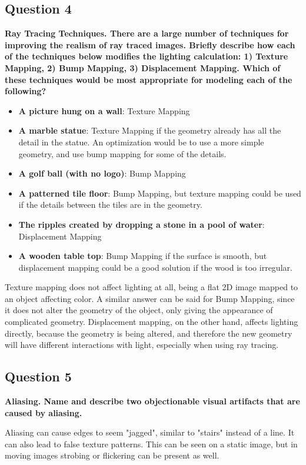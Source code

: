 \documentclass[12pt]{article}
\begin{document}
\subsection*{Question 4}
{\bfseries Ray Tracing Techniques. There are a large number of techniques for improving the realism of ray traced images. Briefly describe how each of the techniques below modifies the lighting calculation: 1) Texture Mapping, 2) Bump Mapping, 3) Displacement Mapping. Which of these techniques would be most appropriate for modeling each of the following?}
\begin{itemize}
    \item \textbf{A picture hung on a wall}: Texture Mapping
    \item \textbf{A marble statue}: Texture Mapping if the geometry already has all the detail in the statue. An optimization would be to use a more simple geometry, and use bump mapping for some of the details.
    \item \textbf{A golf ball (with no logo)}: Bump Mapping
    \item \textbf{A patterned tile floor}: Bump Mapping, but texture mapping could be used if the details between the tiles are in the geometry.
    \item \textbf{The ripples created by dropping a stone in a pool of water}: Displacement Mapping
    \item \textbf{A wooden table top}: Bump Mapping if the surface is smooth, but displacement mapping could be a good solution if the wood is too irregular.
\end{itemize}

Texture mapping does not affect lighting at all, being a flat 2D image mapped to an object affecting color. A similar answer can be said for Bump Mapping, since it does not alter the geometry of the object, only giving the appearance of complicated geometry. Displacement mapping, on the other hand, affects lighting directly, because the geometry is being altered, and therefore the new geometry will have different interactions with light, especially when using ray tracing.

\subsection*{Question 5}
{\bfseries Aliasing. Name and describe two objectionable visual artifacts that are caused by aliasing.}

Aliasing can cause edges to seem "jagged", similar to "stairs" instead of a line. It can also lead to false texture patterns. This can be seen on a static image, but in moving images strobing or flickering can be present as well.
\end{document}
